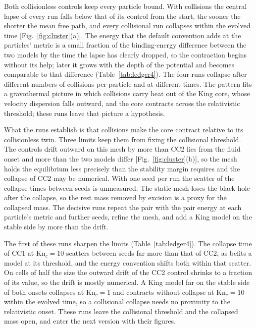 \documentclass[aps,prd,twocolumn,10pt,superscriptaddress,nofootinbib,longbibliography,floatfix]{revtex4-2}
\newcommand{\Kn}{\mathrm{Kn}}
\begin{document}
Both collisionless controls keep every particle bound. With collisions the central lapse of every run falls below that of its control from the start, the sooner the shorter the mean free path, and every collisional run collapses within the evolved time [Fig.~\ref{fig:cluster}(a)]. The energy that the default convention adds at the particles' metric is a small fraction of the binding-energy difference between the two models by the time the lapse has clearly dropped, so the contraction begins without its help; later it grows with the depth of the potential and becomes comparable to that difference (Table~\ref{tab:ledger4}). The four runs collapse after different numbers of collisions per particle and at different times. The pattern fits a gravothermal picture in which collisions carry heat out of the King core, whose velocity dispersion falls outward, and the core contracts across the relativistic threshold; these runs leave that picture a hypothesis.

What the runs establish is that collisions make the core contract relative to its collisionless twin. Three limits keep them from fixing the collisional threshold. The controls drift outward on this mesh by more than CC2 lies from the fluid onset and more than the two models differ [Fig.~\ref{fig:cluster}(b)], so the mesh holds the equilibrium less precisely than the stability margin requires and the collapse of CC2 may be numerical. With one seed per run the scatter of the collapse times between seeds is unmeasured. The static mesh loses the black hole after the collapse, so the rest mass removed by excision is a proxy for the collapsed mass. The decisive runs repeat the pair with the pair energy at each particle's metric and further seeds, refine the mesh, and add a King model on the stable side by more than the drift.

The first of these runs sharpen the limits (Table~\ref{tab:ledger4}). The collapse time of CC1 at $\Kn_c=10$ scatters between seeds far more than that of CC2, as befits a model at its threshold, and the energy convention shifts both within that scatter. On cells of half the size the outward drift of the CC2 control shrinks to a fraction of its value, so the drift is mostly numerical. A King model far on the stable side of both onsets collapses at $\Kn_c=1$ and contracts without collapse at $\Kn_c=10$ within the evolved time, so a collisional collapse needs no proximity to the relativistic onset. These runs leave the collisional threshold and the collapsed mass open, and enter the next version with their figures.
\end{document}
